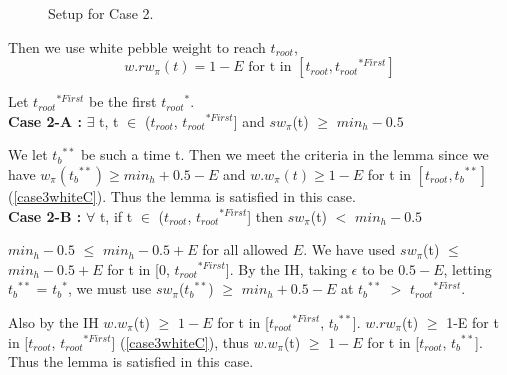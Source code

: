 \documentclass[12pt]{article}
\newenvironment{proofL}{\hspace{.4em}}
                      {\hspace{\fill}{$\blacksquare$} \smallskip}
\newcommand{\troot}{t_{root}}
\newcommand{\troots}{{t_{root}}^*}
\newcommand{\tbss}{{t_b}^{**}}
\newcommand{\tbs}{{t_b}^{*}}
\newcommand{\trootsFirst}{{t_{root}}^{*First}}
\begin{document}
\begin{proofL}
\begin{figure}[H]

\caption{Setup for Case 2.}
\end{figure}

Then we use white pebble weight to reach $\troot$,
\begin{equation}w.rw_{\pi}(t)=1-E\textrm{ for t in }[\troot, \trootsFirst]  \label{case3whiteC}\end{equation}

Let $\trootsFirst$ be the first $\troots$. \\

\noindent
{\bf Case 2-A :} $\exists$ t, t $\in$ ($\troot$, $\trootsFirst$] and $sw_{\pi}$(t) $\geq$ $min_h-0.5$ 

We let $\tbss$ be such a time t. Then we meet the criteria in the lemma since we have $w_\pi(\tbss) \geq min_h+0.5-E$ and $w.w_\pi(t) \geq 1-E$ for t in $[\troot, \tbss]$ (\ref{case3whiteC}). Thus the lemma is satisfied in this case.\\

\noindent
{\bf Case 2-B :} $\forall$ t, if t $\in$ ($\troot$, $\trootsFirst$] then $sw_{\pi}$(t) $<$ $min_h-0.5$

$min_h-0.5$ $\leq$ $min_h-0.5 + E$ for all allowed $E$. We have used $sw_{\pi}$(t) $\leq$ $min_h-0.5 + E$ for t in [0, $\trootsFirst$]. By the IH, taking $\epsilon$ to be $0.5-E$,  letting $\tbss$ = $\tbs$, we must use $sw_{\pi}$($\tbss$) $\geq$ $min_h+0.5-E$ at $\tbss$ $>$ $\trootsFirst$. 

Also by the IH $w.w_{\pi}$(t) $\geq$ $1-E$ for t in [$\trootsFirst$, $\tbss $]. $w.rw_{\pi}$(t) $\geq$ 1-E for t in [$\troot$, $\trootsFirst$] (\ref{case3whiteC}), thus $w.w_{\pi}$(t) $\geq$ $1-E$ for t in [$\troot$, $\tbss$]. Thus the lemma is satisfied in this case.\\

\begin{figure}[H]
  \centering
\end{figure}
\end{proofL}
\end{document}
